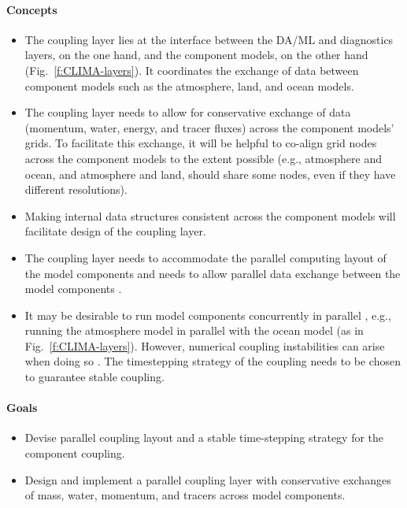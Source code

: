 \documentclass{article}
\begin{document}
\paragraph{Concepts}
\begin{itemize}
    \item The coupling layer lies at the interface between the DA/ML and diagnostics layers, on the one hand, and the component models, on the other hand (Fig.~\ref{f:CLIMA-layers}). It coordinates the exchange of data between component models such as the atmosphere, land, and ocean models.  
    \item The coupling layer needs to allow for conservative exchange of data (momentum, water, energy, and tracer fluxes) across the component models' grids. To facilitate this exchange, it will be helpful to co-align grid nodes across the component models to the extent possible (e.g., atmosphere and ocean, and atmosphere and land, should share some nodes, even if they have different resolutions).
    \item Making internal data structures consistent across the component models will facilitate design of the coupling layer. 
    \item The coupling layer needs to accommodate the parallel computing layout of the model components and needs to allow parallel data exchange between the model components \citep[e.g.,][]{Larson05a}. 
    \item It may be desirable to run model components concurrently in parallel \citep{Balaji16a}, e.g., running the atmosphere model in parallel with the ocean model (as in Fig.~\ref{f:CLIMA-layers}). However, numerical coupling instabilities can arise when doing so \citep{Hallberg14a}. The timestepping strategy of the coupling needs to be chosen to guarantee stable coupling. 
\end{itemize}

\paragraph{Goals}
\begin{itemize}
    \item Devise parallel coupling layout and a stable time-stepping strategy for the component coupling.
    \item Design and implement a parallel coupling layer with conservative exchanges of mass, water, momentum, and tracers across model components.  
\end{itemize}
\end{document}
